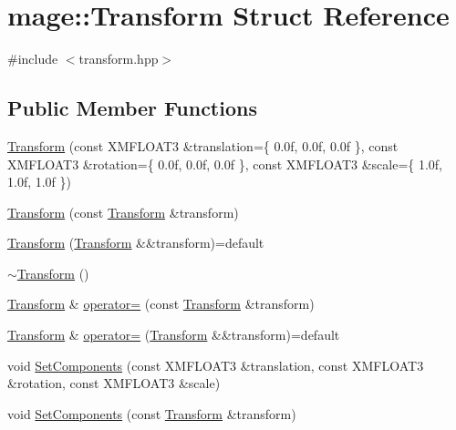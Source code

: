 \hypertarget{structmage_1_1_transform}{}\section{mage\+:\+:Transform Struct Reference}
\label{structmage_1_1_transform}


{\ttfamily \#include $<$transform.\+hpp$>$}

\subsection*{Public Member Functions}
\begin{DoxyCompactItemize}
\item 
\hyperlink{structmage_1_1_transform_a3d324dc935e11ee5e82957d58553fd7d}{Transform} (const X\+M\+F\+L\+O\+A\+T3 \&translation=\{ 0.\+0f, 0.\+0f, 0.\+0f \}, const X\+M\+F\+L\+O\+A\+T3 \&rotation=\{ 0.\+0f, 0.\+0f, 0.\+0f \}, const X\+M\+F\+L\+O\+A\+T3 \&scale=\{ 1.\+0f, 1.\+0f, 1.\+0f \})
\item 
\hyperlink{structmage_1_1_transform_a6cf7a754eff6ffe6f99f8942468d49bc}{Transform} (const \hyperlink{structmage_1_1_transform}{Transform} \&transform)
\item 
\hyperlink{structmage_1_1_transform_a79c128d8c73c8854765e8ea8fa5f42e1}{Transform} (\hyperlink{structmage_1_1_transform}{Transform} \&\&transform)=default
\item 
\hyperlink{structmage_1_1_transform_a3380713ee853d112c140e8688c0f73b5}{$\sim$\+Transform} ()
\item 
\hyperlink{structmage_1_1_transform}{Transform} \& \hyperlink{structmage_1_1_transform_a40bc8c32b09dc419d0573fffcd938644}{operator=} (const \hyperlink{structmage_1_1_transform}{Transform} \&transform)
\item 
\hyperlink{structmage_1_1_transform}{Transform} \& \hyperlink{structmage_1_1_transform_a73f47760665264da8af254fa937b3560}{operator=} (\hyperlink{structmage_1_1_transform}{Transform} \&\&transform)=default
\item 
void \hyperlink{structmage_1_1_transform_aba5311db1360a15aea4de33a060ab27e}{Set\+Components} (const X\+M\+F\+L\+O\+A\+T3 \&translation, const X\+M\+F\+L\+O\+A\+T3 \&rotation, const X\+M\+F\+L\+O\+A\+T3 \&scale)
\item 
void \hyperlink{structmage_1_1_transform_a734e5efbc285bde2c4252693a9304421}{Set\+Components} (const \hyperlink{structmage_1_1_transform}{Transform} \&transform)
\item 

\end{DoxyCompactItemize}
